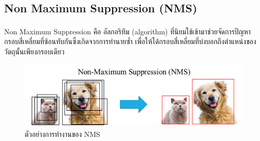 \subsection*{Non Maximum Suppression (NMS)}
Non Maximum Suppression\textsuperscript{\cite{nms}} คือ อัลกอริทึม (algorithm) ที่นิยมใช้เข้ามาช่วยจัดการปัญหากรอบสี่เหลี่ยมที่ซ้อนทับกันซึ่งเกิดจากการทำนายซ้ำ เพื่อให้ได้กรอบสี่เหลี่ยมที่บ่งบอกถึงตำแหน่งของวัตถุนั้นเพียงกรอบเดียว 
\begin{figure}[!ht]
	\centering
	\includegraphics[scale=0.3]{chapter2/images/NMS.png}
		\caption[ตัวอย่างการทำงานของ NMS]{ตัวอย่างการทำงานของ NMS\textsuperscript{\cite{nms_pic}}}
    	\label{fig:NMS}
\end{figure}

